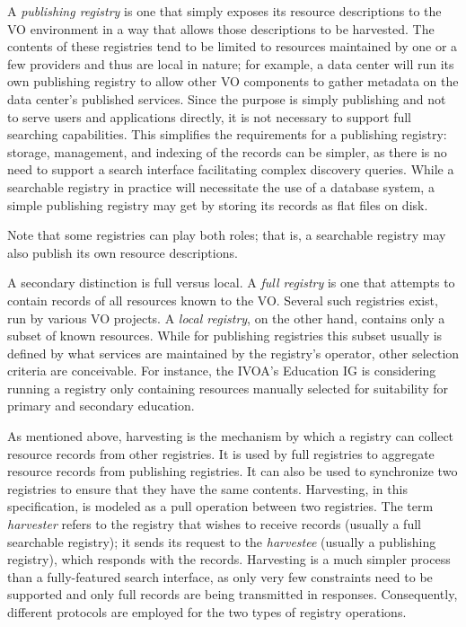 \documentclass{ivoa}
\begin{document}
A \emph{publishing registry} is one that simply exposes its resource
descriptions to the VO environment in a way that allows those
descriptions to be harvested. The contents of these registries tend to
be limited to resources maintained by one or a few providers and thus
are local in nature; for example, a data center will run its own
publishing registry to allow other VO components to gather metadata on
the data center's published services.
Since the purpose is simply publishing and not to serve
users and applications directly, it is not necessary to support full
searching capabilities. This simplifies the requirements for a
publishing registry: 
storage, management, and indexing of the records can be simpler, as
there is no need to support a
search interface facilitating complex discovery queries.
While a searchable registry in practice will necessitate the
use of a database system, a simple publishing registry may get by
storing its records as flat files on disk.

Note that some registries can play both roles; that is, a searchable
registry may also publish its own resource descriptions.

A secondary distinction is full versus local. A \emph{full registry}
is one that attempts to contain records of all resources known to the VO.
Several such registries exist, run by various VO projects.  A
\emph{local registry}, on the other hand, contains only a subset of
known resources. While for publishing registries this subset usually is
defined by what services are maintained by the registry's operator,
other selection criteria are conceivable.  For instance, the IVOA's
Education IG is considering running a registry only containing resources
manually selected for suitability for primary and secondary education.

As mentioned above, harvesting is the mechanism by which a registry can
collect resource records from other registries. It is used by full
registries to aggregate resource records from publishing
registries. It can also be used to synchronize two registries to ensure
that they have the same contents. Harvesting, in this specification, is
modeled as a pull operation between two registries. The term
\emph{harvester} refers to the registry that wishes to receive records
(usually a full searchable registry); it sends its request to the
\emph{harvestee} (usually a publishing registry), which responds with
the records.  Harvesting is a much simpler process than a fully-featured
search interface, as only very few constraints need to be supported and
only full records are being transmitted in responses.  
Consequently, different protocols are  employed for the
two types of registry operations.
\end{document}

